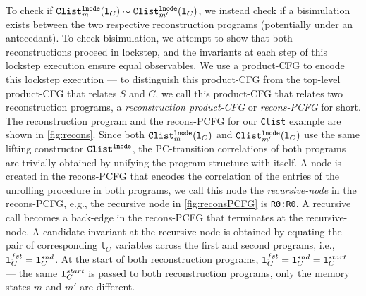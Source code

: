 To check if ${\tt Clist}_m^{{\tt lnode}}({\tt l}_C)
\sim{} {\tt Clist}_{m'}^{{\tt lnode}}({\tt l}_C)$, we instead
check if a bisimulation exists
between the two respective reconstruction programs (potentially
under an antecedant).
To check bisimulation, we attempt to show that both reconstructions
proceed in lockstep, and the invariants at
each step of this lockstep execution ensure equal observables.
We use a product-CFG to encode this lockstep execution --- to distinguish this
product-CFG from the top-level product-CFG that relates $S$ and $C$, we call
this product-CFG that relates two reconstruction programs, a {\em reconstruction product-CFG}
or {\em recons-PCFG} for short.
The reconstruction
program and the recons-PCFG for our {\tt Clist} example
are shown in \cref{fig:recons}.
Since both ${\tt Clist}_m^{{\tt lnode}}({\tt l}_C)$
and ${\tt Clist}_{m'}^{{\tt lnode}}({\tt l}_C)$ use the same
lifting constructor ${\tt Clist}^{\tt lnode}$, the PC-transition correlations of both programs
are trivially obtained
by unifying the program structure with itself. A node
is created in the recons-PCFG that
encodes the correlation of the entries of the unrolling procedure in
both programs, we call this node the {\em recursive-node} in the
recons-PCFG, e.g., the
recursive node in \cref{fig:reconsPCFG} is {\tt R0:R0}. A recursive
call becomes a back-edge in the recons-PCFG that terminates at the
recursive-node.
A candidate
invariant at the recursive-node
is obtained by equating the pair of corresponding
{\tt l}$_C$ variables across the first and second
programs, i.e.,
${\tt l}^{fst}_C={\tt l}^{snd}_C$.
At the start of
both reconstruction
programs, ${\tt l}^{fst}_C={\tt l}^{snd}_C={\tt l}^{start}_C$
--- the
same ${\tt l}^{start}_C$ is passed to both reconstruction
programs, only the memory states $m$ and $m'$ are different.
